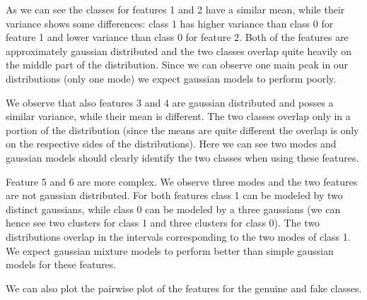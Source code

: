 \documentclass[12pt]{report}
\newcommand{\nnl}{%
    \newline
    \newline
}
\begin{document}
\noindent
As we can see the classes for features 1 and 2 have a similar mean, while their variance shows some differences: class 1 has higher variance than class 0 for feature 1 and lower variance than class 0 for feature 2. Both of the features are approximately gaussian distributed and the two classes overlap quite heavily on the middle part of the distribution. Since we can observe one main peak in our distributions (only one mode) we expect gaussian models to perform poorly.
\nnl
We observe that also features 3 and 4 are gaussian distributed and posses a similar variance, while their mean is different. The two classes overlap only in a portion of the distribution (since the means are quite different the overlap is only on the respective sides of the distributions). Here we can see two modes and gaussian models should clearly identify the two classes when using these features.
\nnl
Feature 5 and 6 are more complex. We observe three modes and the two features are not gaussian distributed. For both features class 1 can be modeled by two distinct gaussians, while class 0 can be modeled by a three gaussians (we can hence see two clusters for class 1 and three clusters for class 0). The two distributions overlap in the intervals corresponding to the two modes of class 1.
We expect gaussian mixture models to perform better than simple gaussian models for these features.
\nnl
We can also plot the pairwise plot of the features for the genuine and fake classes.
\end{document}
